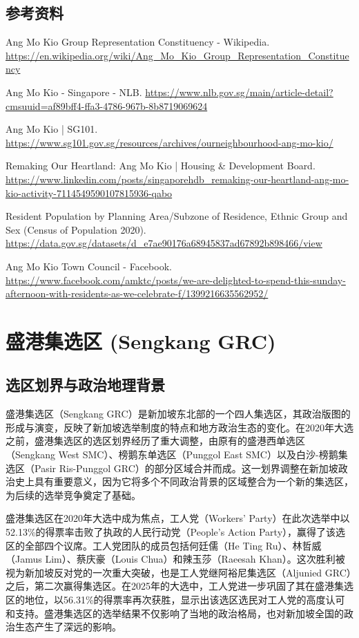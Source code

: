 \documentclass[11pt,a4paper,twoside,openany]{book}
\begin{document}
\section*{参考资料}
\begin{enumerate}[label={[\arabic*]},leftmargin=*,topsep=2pt,itemsep=1pt,parsep=0pt]
  \item Ang Mo Kio Group Representation Constituency - Wikipedia. \url{https://en.wikipedia.org/wiki/Ang_Mo_Kio_Group_Representation_Constituency}
  \item Ang Mo Kio - Singapore - NLB. \url{https://www.nlb.gov.sg/main/article-detail?cmsuuid=af89bff4-ffa3-4786-967b-8b8719069624}
  \item Ang Mo Kio | SG101. \url{https://www.sg101.gov.sg/resources/archives/ourneighbourhood-ang-mo-kio/}
  \item Remaking Our Heartland: Ang Mo Kio | Housing \& Development Board. \url{https://www.linkedin.com/posts/singaporehdb_remaking-our-heartland-ang-mo-kio-activity-7114549590107815936-qabo}
  \item Resident Population by Planning Area/Subzone of Residence, Ethnic Group and Sex (Census of Population 2020). \url{https://data.gov.sg/datasets/d_e7ae90176a68945837ad67892b898466/view}
  \item Ang Mo Kio Town Council - Facebook. \url{https://www.facebook.com/amktc/posts/we-are-delighted-to-spend-this-sunday-afternoon-with-residents-as-we-celebrate-f/1399216635562952/}
\end{enumerate}

\chapter{盛港集选区 (Sengkang GRC)}

\section{选区划界与政治地理背景}
盛港集选区（Sengkang GRC）是新加坡东北部的一个四人集选区，其政治版图的形成与演变，反映了新加坡选举制度的特点和地方政治生态的变化。在2020年大选之前，盛港集选区的选区划界经历了重大调整，由原有的盛港西单选区（Sengkang West SMC）、榜鹅东单选区（Punggol East SMC）以及白沙-榜鹅集选区（Pasir Ris-Punggol GRC）的部分区域合并而成。这一划界调整在新加坡政治史上具有重要意义，因为它将多个不同政治背景的区域整合为一个新的集选区，为后续的选举竞争奠定了基础。

盛港集选区在2020年大选中成为焦点，工人党（Workers' Party）在此次选举中以52.13\%的得票率击败了执政的人民行动党（People's Action Party），赢得了该选区的全部四个议席。工人党团队的成员包括何廷儒（He Ting Ru）、林哲威（Jamus Lim）、蔡庆豪（Louis Chua）和辣玉莎（Raeesah Khan）。这次胜利被视为新加坡反对党的一次重大突破，也是工人党继阿裕尼集选区（Aljunied GRC）之后，第二次赢得集选区。在2025年的大选中，工人党进一步巩固了其在盛港集选区的地位，以56.31\%的得票率再次获胜，显示出该选区选民对工人党的高度认可和支持。盛港集选区的选举结果不仅影响了当地的政治格局，也对新加坡全国的政治生态产生了深远的影响。
\end{document}
